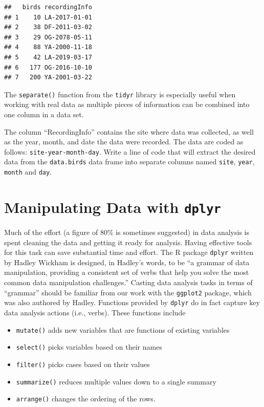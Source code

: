 \documentclass[
]{krantz}
\providecommand{\tightlist}{%
  \setlength{\itemsep}{0pt}\setlength{\parskip}{0pt}}
\begin{document}
\begin{verbatim}
##   birds recordingInfo
## 1    10 LA-2017-01-01
## 2    38 DF-2011-03-02
## 3    29 OG-2078-05-11
## 4    88 YA-2000-11-18
## 5    42 LA-2019-03-17
## 6   177 OG-2016-10-10
## 7   200 YA-2001-03-22
\end{verbatim}

The \texttt{separate()} function from the \texttt{tidyr} library is especially useful when working with real data as multiple pieces of information can be combined into one column in a data set.

The column ``RecordingInfo'' contains the site where data was collected, as well as the year, month, and date the data were recorded. The data are coded as follows: \texttt{site-year-month-day}. Write a line of code that will extract the desired data from the \texttt{data.birds} data frame into separate columns named \texttt{site}, \texttt{year}, \texttt{month} and \texttt{day}.

\hypertarget{dplyr}{%
\section{\texorpdfstring{Manipulating Data with \texttt{dplyr}}{Manipulating Data with dplyr}}\label{dplyr}}

Much of the effort (a figure of 80\% is sometimes suggested) in data analysis is spent cleaning the data and getting it ready for analysis. Having effective tools for this task can save substantial time and effort. The R package \texttt{dplyr} written by Hadley Wickham is designed, in Hadley's words, to be ``a grammar of data manipulation, providing a consistent set of verbs that help you solve the most common data manipulation challenges.'' Casting data analysis tasks in terms of ``grammar'' should be familiar from our work with the \texttt{ggplot2} package, which was also authored by Hadley. Functions provided by \texttt{dplyr} do in fact capture key data analysis actions (i.e., verbs). These functions include

\begin{itemize}
\tightlist
\item
  \texttt{mutate()} adds new variables that are functions of existing variables
\item
  \texttt{select()} picks variables based on their names
\item
  \texttt{filter()} picks cases based on their values
\item
  \texttt{summarize()} reduces multiple values down to a single summary
\item
  \texttt{arrange()} changes the ordering of the rows.
\end{itemize}
\end{document}
